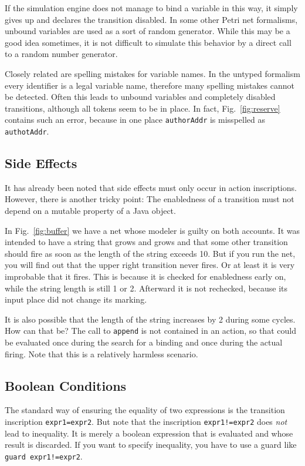 If the simulation engine does not
manage to bind a variable in this way, it simply gives up and
declares the transition disabled. In some other Petri net
formalisms, unbound variables are used as a sort of random
generator. While this may be a good idea sometimes,
it is not difficult to simulate this behavior by a
direct call to a random number generator.

Closely related are spelling mistakes for variable names.
In the untyped formalism every identifier is a legal variable
name, therefore many spelling mistakes cannot be detected.
Often this leads to unbound variables and completely
disabled transitions, although all tokens seem to be in place.
In fact, Fig.~\ref{fig:reserve} contains such an error, because
in one place \texttt{authorAddr} is misspelled
as \texttt{authotAddr}.


\subsection{Side Effects}

It has already been noted that side effects must only occur
in action inscriptions. However, there is another tricky point:
The enabledness of a transition must not depend on a mutable
property of a Java object.


In Fig.~\ref{fig:buffer} we have a net whose modeler is guilty
on both accounts. It was intended to have a string that
grows and grows and that some other transition should fire
as soon as the length of the string exceeds 10. But if you run
the net, you will find out that the upper right transition
never fires. Or at least it is very improbable that it fires.
This is because it is checked for enabledness early on, while the
string length is still 1 or 2. Afterward it is not rechecked,
because its input place did not change its marking.

It is also possible that the length of the string increases
by 2 during some cycles. How can that be? The call to \texttt{append}
is not contained in an action, so that could be evaluated once during
the search for a binding and once during the actual firing.
Note that this is a relatively harmless scenario.


\subsection{Boolean Conditions}

The standard way of ensuring the equality of two expressions
is the transition inscription \texttt{expr1=expr2}. But note
that the inscription \texttt{expr1!=expr2} does \emph{not}
lead to inequality. It is merely a boolean expression that
is evaluated and whose result is discarded. If you want to
specify inequality, you have to use a guard like
\texttt{guard expr1!=expr2}.


